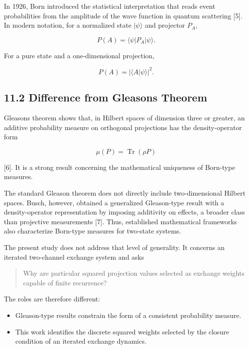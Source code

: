 \documentclass[
  a4paper,
  10pt]{article}
\providecommand{\tightlist}{%
  \setlength{\itemsep}{0pt}\setlength{\parskip}{0pt}}
\begin{document}
In 1926, Born introduced the statistical interpretation that reads event
probabilities from the amplitude of the wave function in quantum
scattering {[}5{]}. In modern notation, for a normalized state
\(|\psi\rangle\) and projector \(P_A\),

\[
P(A)=\langle\psi|P_A|\psi\rangle.
\]

For a pure state and a one-dimensional projection,

\[
P(A)=|\langle A|\psi\rangle|^2.
\]

\subsection{11.2 Difference from Gleason\textquotesingle s
Theorem}\label{112-difference-from-gleasons-theorem}

Gleason\textquotesingle s theorem shows that, in Hilbert spaces of
dimension three or greater, an additive probability measure on
orthogonal projections has the density-operator form

\[
\mu(P)=\operatorname{Tr}(\rho P)
\]

{[}6{]}. It is a strong result concerning the mathematical uniqueness of
Born-type measures.

The standard Gleason theorem does not directly include two-dimensional
Hilbert spaces. Busch, however, obtained a generalized Gleason-type
result with a density-operator representation by imposing additivity on
effects, a broader class than projective measurements {[}7{]}. Thus,
established mathematical frameworks also characterize Born-type measures
for two-state systems.

The present study does not address that level of generality. It concerns
an iterated two-channel exchange system and asks

\begin{quote}
Why are particular squared projection values selected as exchange
weights capable of finite recurrence?
\end{quote}

The roles are therefore different:

\begin{itemize}
\tightlist
\item
  Gleason-type results constrain the form of a consistent probability
  measure.
\item
  This work identifies the discrete squared weights selected by the
  closure condition of an iterated exchange dynamics.
\end{itemize}
\end{document}
